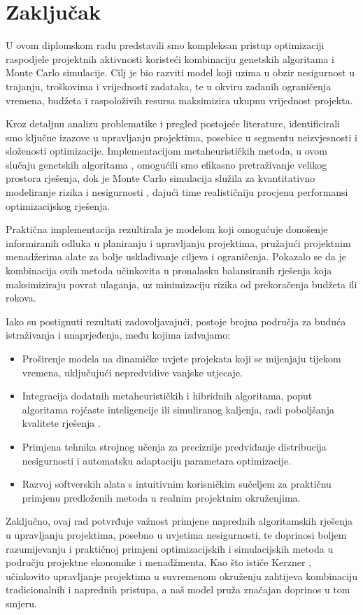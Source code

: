 \section{Zaključak}

U ovom diplomskom radu predstavili smo kompleksan pristup optimizaciji raspodjele projektnih aktivnosti koristeći kombinaciju genetskih algoritama i Monte Carlo simulacije. Cilj je bio razviti model koji uzima u obzir nesigurnost u trajanju, troškovima i vrijednosti zadataka, te u okviru zadanih ograničenja vremena, budžeta i raspoloživih resursa maksimizira ukupnu vrijednost projekta.

Kroz detaljnu analizu problematike i pregled postojeće literature, identificirali smo ključne izazove u upravljanju projektima, posebice u segmentu neizvjesnosti i složenosti optimizacije. Implementacijom metaheurističkih metoda, u ovom slučaju genetskih algoritama \cite{Goldberg1989, Mitchell1998}, omogućili smo efikasno pretraživanje velikog prostora rješenja, dok je Monte Carlo simulacija služila za kvantitativno modeliranje rizika i nesigurnosti \cite{Miller2009, Avlijas2008}, dajući time realističniju procjenu performansi optimizacijskog rješenja.

Praktična implementacija rezultirala je modelom koji omogućuje donošenje informiranih odluka u planiranju i upravljanju projektima, pružajući projektnim menadžerima alate za bolje usklađivanje ciljeva i ograničenja. Pokazalo se da je kombinacija ovih metoda učinkovita u pronalasku balansiranih rješenja koja maksimiziraju povrat ulaganja, uz minimizaciju rizika od prekoračenja budžeta ili rokova.

Iako su postignuti rezultati zadovoljavajući, postoje brojna područja za buduća istraživanja i unaprjeđenja, među kojima izdvajamo:
\begin{itemize}
    \item Proširenje modela na dinamičke uvjete projekata koji se mijenjaju tijekom vremena, uključujući nepredvidive vanjske utjecaje.
    \item Integracija dodatnih metaheurističkih i hibridnih algoritama, poput algoritama rojčaste inteligencije ili simuliranog kaljenja, radi poboljšanja kvalitete rješenja \cite{Gandomi2013}.
    \item Primjena tehnika strojnog učenja za preciznije predviđanje distribucija nesigurnosti i automatsku adaptaciju parametara optimizacije.
    \item Razvoj softverskih alata s intuitivnim korisničkim sučeljem za praktičnu primjenu predloženih metoda u realnim projektnim okruženjima.
\end{itemize}

Zaključno, ovaj rad potvrđuje važnost primjene naprednih algoritamskih rješenja u upravljanju projektima, posebno u uvjetima nesigurnosti, te doprinosi boljem razumijevanju i praktičnoj primjeni optimizacijskih i simulacijskih metoda u području projektne ekonomike i menadžmenta. Kao što ističe Kerzner \cite{Kerzner2017}, učinkovito upravljanje projektima u suvremenom okruženju zahtijeva kombinaciju tradicionalnih i naprednih pristupa, a naš model pruža značajan doprinos u tom smjeru.


